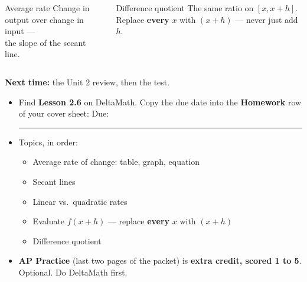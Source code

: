 \documentclass[aspectratio=169, 11pt]{beamer}
\begin{document}
\begin{frame}[t, plain]

  \begin{columns}[T]
      \begin{block}{Average rate}
        Change in output over change in input ---\\ the slope of the secant line.
      \end{block}
      \begin{block}{Difference quotient}
        The same ratio on \([x, x + h]\). Replace \textbf{every} \(x\) with \((x + h)\) ---
        never just add \(h\).
      \end{block}
  \end{columns}

  \bigskip
  \textbf{Next time:} the Unit 2 review, then the test.
\end{frame}

\begin{frame}[t, plain]

  \begin{itemize}\setlength{\itemsep}{6pt}
    \item Find \textbf{Lesson 2.6} on DeltaMath. Copy the due date into the
          \textbf{Homework} row of your cover sheet: \quad Due: \rule{3cm}{0.4pt}
    \item Topics, in order:
          \begin{itemize}\setlength{\itemsep}{1pt}
            \item Average rate of change: table, graph, equation
            \item Secant lines
            \item Linear vs.\ quadratic rates
            \item Evaluate \(f(x + h)\) --- replace \textbf{every} \(x\) with \((x + h)\)
            \item Difference quotient
          \end{itemize}
    \item \textbf{AP Practice} (last two pages of the packet) is \textbf{extra credit, scored 1 to 5}.
          Optional. Do DeltaMath first.
  \end{itemize}
\end{frame}
\end{document}
